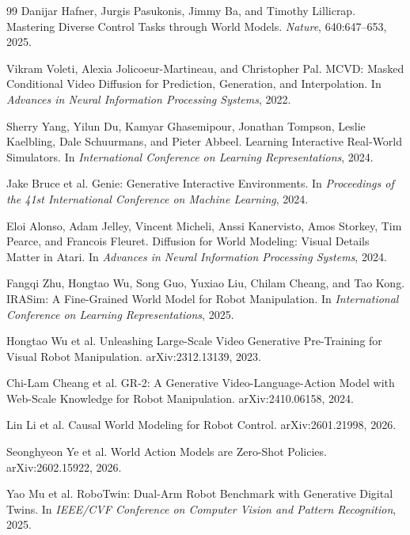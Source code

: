 \documentclass[10pt,twocolumn,letterpaper]{article}
\begin{document}
\begin{thebibliography}{99}
Danijar Hafner, Jurgis Pasukonis, Jimmy Ba, and Timothy Lillicrap.
\newblock Mastering Diverse Control Tasks through World Models.
\newblock \emph{Nature}, 640:647--653, 2025.

Vikram Voleti, Alexia Jolicoeur-Martineau, and Christopher Pal.
\newblock MCVD: Masked Conditional Video Diffusion for Prediction, Generation,
and Interpolation.
\newblock In \emph{Advances in Neural Information Processing Systems}, 2022.

Sherry Yang, Yilun Du, Kamyar Ghasemipour, Jonathan Tompson, Leslie Kaelbling,
Dale Schuurmans, and Pieter Abbeel.
\newblock Learning Interactive Real-World Simulators.
\newblock In \emph{International Conference on Learning Representations}, 2024.

Jake Bruce et al.
\newblock Genie: Generative Interactive Environments.
\newblock In \emph{Proceedings of the 41st International Conference on Machine
Learning}, 2024.

Eloi Alonso, Adam Jelley, Vincent Micheli, Anssi Kanervisto, Amos Storkey, Tim
Pearce, and Francois Fleuret.
\newblock Diffusion for World Modeling: Visual Details Matter in Atari.
\newblock In \emph{Advances in Neural Information Processing Systems}, 2024.

Fangqi Zhu, Hongtao Wu, Song Guo, Yuxiao Liu, Chilam Cheang, and Tao Kong.
\newblock IRASim: A Fine-Grained World Model for Robot Manipulation.
\newblock In \emph{International Conference on Learning Representations}, 2025.

Hongtao Wu et al.
\newblock Unleashing Large-Scale Video Generative Pre-Training for Visual Robot
Manipulation.
\newblock arXiv:2312.13139, 2023.

Chi-Lam Cheang et al.
\newblock GR-2: A Generative Video-Language-Action Model with Web-Scale
Knowledge for Robot Manipulation.
\newblock arXiv:2410.06158, 2024.

Lin Li et al.
\newblock Causal World Modeling for Robot Control.
\newblock arXiv:2601.21998, 2026.

Seonghyeon Ye et al.
\newblock World Action Models are Zero-Shot Policies.
\newblock arXiv:2602.15922, 2026.

Yao Mu et al.
\newblock RoboTwin: Dual-Arm Robot Benchmark with Generative Digital Twins.
\newblock In \emph{IEEE/CVF Conference on Computer Vision and Pattern
Recognition}, 2025.


\end{thebibliography}
\end{document}
